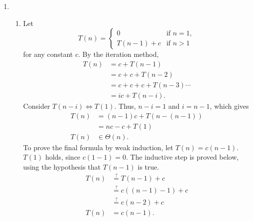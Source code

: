 \documentclass[12pt]{article}
\newcommand{\posseq}{\stackrel{?}{=}}
\begin{document}
\begin{enumerate}
  \item
  \begin{enumerate}
    \item Let \[
      T(n) = 
      \begin{cases}
        0            & \text{if } n = 1, \\
        T(n - 1) + c & \text{if } n > 1
      \end{cases}
    \] 
    for any constant $c$. By the iteration method,
    \begin{align*}
      T(n) & = c + T(n - 1)                \\
           & = c + c + T(n - 2)            \\
           & = c + c + c + T(n - 3) \cdots \\
           & = ic + T(n - i).
    \end{align*}
    Consider $T(n - i) \Leftrightarrow T(1)$. Thus, $n - i = 1$ and $i = n - 1$, which gives
    \begin{align*}
      T(n) & = (n - 1)c + T(n - (n - 1)) \\
           & = nc - c + T(1)             \\
      T(n) & \in \Theta(n).
    \end{align*}
    To prove the final formula by weak induction, let $T(n) = c(n - 1)$. $T(1)$ holds, since $c(1 - 1) = 0$. The inductive step is proved below, using the hypothesis that $T(n - 1)$ is true.
    \begin{align*}
      T(n) & \posseq T(n - 1) + c       \\
           & \posseq c((n - 1) - 1) + c \\
           & \posseq c(n - 2) + c       \\
      T(n) & = c(n - 1).
    \end{align*}
    

\end{enumerate}
\end{enumerate}
\end{document}
